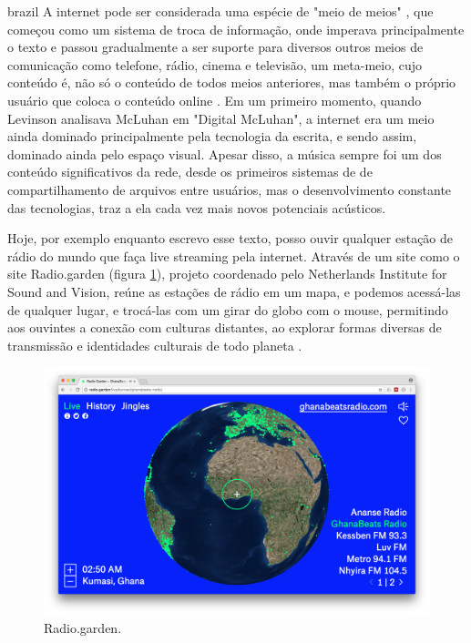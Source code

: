 \begin{otherlanguage*}{brazil}
    A internet pode ser considerada uma espécie de "meio de meios" \cite[5]{Levinson2001}, que começou como um sistema de troca de informação, onde imperava principalmente o texto e passou gradualmente a ser suporte para diversos outros  meios de comunicação como telefone, rádio, cinema e televisão, um meta-meio, cujo conteúdo é, não só o conteúdo de todos meios anteriores, mas também o próprio usuário que coloca o conteúdo online \cite[39]{Levinson2001}. Em um primeiro momento, quando Levinson analisava McLuhan em "Digital McLuhan", a internet era um meio ainda dominado principalmente pela tecnologia da escrita, e sendo assim, dominado ainda pelo espaço visual. Apesar disso, a música sempre foi um dos conteúdo significativos da rede, desde os primeiros sistemas de de compartilhamento de arquivos entre usuários, mas o desenvolvimento constante das tecnologias, traz a ela cada vez mais novos potenciais acústicos.
    
Hoje, por exemplo enquanto escrevo esse texto, posso ouvir qualquer estação de rádio do mundo que faça live streaming pela internet. Através de um site como o site Radio.garden (figura \ref{radiogarden}), projeto coordenado pelo Netherlands Institute for Sound and Vision, reúne as estações de rádio em um mapa, e podemos acessá-las de qualquer lugar, e trocá-las com um girar do globo com o mouse, permitindo aos ouvintes a conexão com culturas distantes, ao explorar formas diversas de transmissão e identidades culturais de todo planeta \cite{caroline2016radio}. 

\begin{figure}[htb]
    \caption{\label{radiogarden} Radio.garden.}
    \begin{center}
        \includegraphics[width=1\linewidth]{pictures/radio_garden_2018-06-10.png}
    \end{center}
    

\end{figure}
\end{otherlanguage*}
